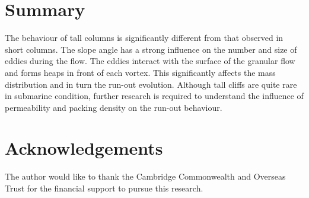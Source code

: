 \documentclass[epj,twocolumn]{webofc}
\begin{document}
\section{Summary}
The behaviour of tall columns is significantly different from that observed in 
short columns. The slope angle has a strong influence on the number 
and size of eddies during the flow. The eddies interact with the surface of the 
granular flow and forms heaps in front of each vortex. This significantly 
affects the mass distribution and in turn the run-out evolution. Although tall 
cliffs are quite rare in submarine condition, further research is
required to understand the influence of permeability and packing density
on the run-out behaviour.




\section*{Acknowledgements}
The author would like to thank the Cambridge Commonwealth and Overseas Trust
for the financial support to pursue this research.

%
% 
%
%
 
\end{document}
